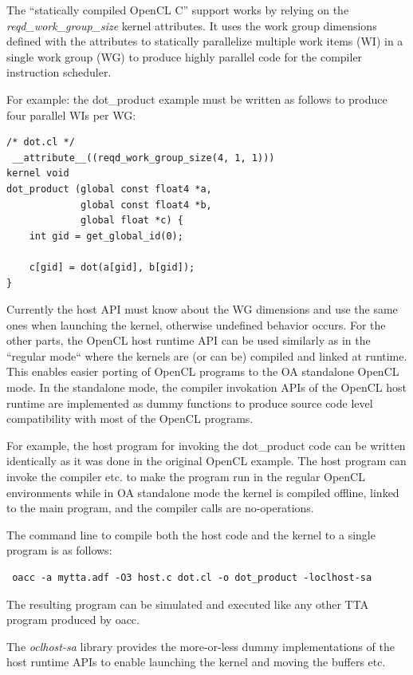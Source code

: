 \documentclass[a4paper,twoside]{tceusermanual}
\begin{document}
The ``statically compiled OpenCL C'' support works by relying on the
\textit{reqd\_work\_group\_size} kernel attributes. It uses the work
group dimensions defined with the attributes to statically parallelize 
multiple work items (WI) in a single work group (WG) to produce highly 
parallel code for the compiler instruction scheduler.

For example: the dot\_product example must be written as follows to
produce four parallel WIs per WG:

\begin{verbatim}
/* dot.cl */
 __attribute__((reqd_work_group_size(4, 1, 1)))
kernel void
dot_product (global const float4 *a,
             global const float4 *b, 
             global float *c) {
    int gid = get_global_id(0);

    c[gid] = dot(a[gid], b[gid]);    
} 
\end{verbatim}

Currently the host API must know about the WG dimensions and use the
same ones when launching the kernel, otherwise undefined behavior
occurs. For the other parts, the OpenCL host runtime API can be used 
similarly as in the ``regular mode`` where the kernels are (or can be)
compiled and linked at runtime. This enables easier porting 
of OpenCL programs to the OA standalone OpenCL mode. In the
standalone mode, the compiler invokation APIs of the OpenCL host runtime 
are implemented as dummy functions to produce source code level 
compatibility with most of the OpenCL programs.

For example, the host program for invoking the dot\_product code
can be written identically as it was done in the original OpenCL
example. The host program can invoke the compiler etc. to make
the program run in the regular OpenCL environments while in OA
standalone mode the kernel is compiled offline, linked to the
main program, and the compiler calls are no-operations.

The command line to compile both the host code and the kernel to
a single program is as follows:

\begin{verbatim}
 oacc -a mytta.adf -O3 host.c dot.cl -o dot_product -loclhost-sa
\end{verbatim}

The resulting program can be simulated and executed like any 
other TTA program produced by oacc.

The \textit{oclhost-sa} library provides the more-or-less dummy
implementations of the host runtime APIs to enable launching the
kernel and moving the buffers etc.
\end{document}

